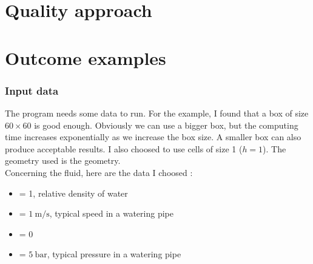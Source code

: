 \newpage
\part{Quality approach}

\newpage
\part{Outcome examples}
\section{Input data}
The program needs some data to run. For the example, I found that a box of size
$\num{60} \times \num{60}$ is good enough. Obviously we can use a bigger box,
but the computing time increases exponentially as we increase the box size.
A smaller box can also produce acceptable results. I also choosed to use cells
of size 1 ($h = 1$). The geometry used is the  geometry.\\
Concerning the fluid, here are the data I choosed :
\begin{itemize}
      \item {} = 1, relative density of water
      \item {} = $\SI{1}{\meter\per\second}$, typical speed in a watering
            pipe
      \item {} = 0
      \item {} = $\SI{5}{\bar}$, typical pressure in a watering
            pipe
\end{itemize}

